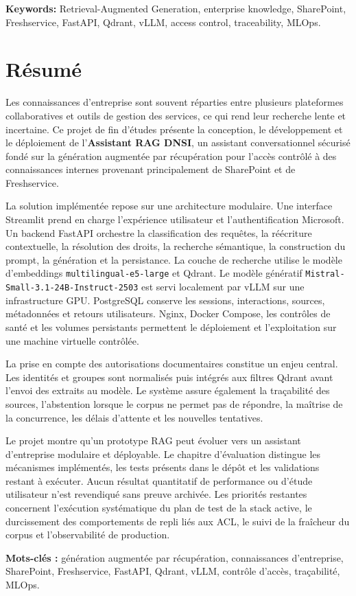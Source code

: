 \noindent\textbf{Keywords:} Retrieval-Augmented Generation, enterprise knowledge, SharePoint, Freshservice, FastAPI, Qdrant, vLLM, access control, traceability, MLOps.

\clearpage

\chapter*{Résumé}

Les connaissances d’entreprise sont souvent réparties entre plusieurs plateformes collaboratives et outils de gestion des services, ce qui rend leur recherche lente et incertaine. Ce projet de fin d’études présente la conception, le développement et le déploiement de l’\textbf{Assistant RAG DNSI}, un assistant conversationnel sécurisé fondé sur la génération augmentée par récupération pour l’accès contrôlé à des connaissances internes provenant principalement de SharePoint et de Freshservice.

La solution implémentée repose sur une architecture modulaire. Une interface Streamlit prend en charge l’expérience utilisateur et l’authentification Microsoft. Un backend FastAPI orchestre la classification des requêtes, la réécriture contextuelle, la résolution des droits, la recherche sémantique, la construction du prompt, la génération et la persistance. La couche de recherche utilise le modèle d’embeddings \texttt{multilingual-e5-large} et Qdrant. Le modèle génératif \texttt{Mistral-Small-3.1-24B-Instruct-2503} est servi localement par vLLM sur une infrastructure GPU. PostgreSQL conserve les sessions, interactions, sources, métadonnées et retours utilisateurs. Nginx, Docker Compose, les contrôles de santé et les volumes persistants permettent le déploiement et l’exploitation sur une machine virtuelle contrôlée.

La prise en compte des autorisations documentaires constitue un enjeu central. Les identités et groupes sont normalisés puis intégrés aux filtres Qdrant avant l’envoi des extraits au modèle. Le système assure également la traçabilité des sources, l’abstention lorsque le corpus ne permet pas de répondre, la maîtrise de la concurrence, les délais d’attente et les nouvelles tentatives.

Le projet montre qu’un prototype RAG peut évoluer vers un assistant d’entreprise modulaire et déployable. Le chapitre d’évaluation distingue les mécanismes implémentés, les tests présents dans le dépôt et les validations restant à exécuter. Aucun résultat quantitatif de performance ou d’étude utilisateur n’est revendiqué sans preuve archivée. Les priorités restantes concernent l’exécution systématique du plan de test de la stack active, le durcissement des comportements de repli liés aux ACL, le suivi de la fraîcheur du corpus et l’observabilité de production.

\noindent\textbf{Mots-clés :} génération augmentée par récupération, connaissances d’entreprise, SharePoint, Freshservice, FastAPI, Qdrant, vLLM, contrôle d’accès, traçabilité, MLOps.
